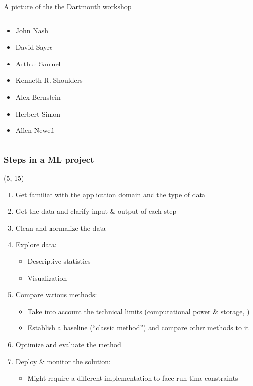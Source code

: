 \begin{frame}{A picture of the the Dartmouth workshop}
\begin{textblock}{95}
\begin{footnotesize}
\begin{columns}[T]
      \begin{column}{0.33\textwidth}
        \begin{itemize}
        \item John Nash
        \item David Sayre
        \item Arthur Samuel
        \item Kenneth R. Shoulders
        \item Alex Bernstein
        \item Herbert Simon
        \item Allen Newell
        \end{itemize}
      \end{column}
    \end{columns}
  \end{footnotesize}
\end{textblock}
\end{frame}


\begin{frame}
  \frametitle{Steps in a \ac{ML} project}

  \begin{textblock}{90}(5, 15)
    \begin{enumerate}
    \item Get familiar with the application domain and the type of data
    \item Get the data and clarify input \& output of each step
    \item Clean and normalize the data
    \item Explore data:
      \begin{itemize}
      \item Descriptive statistics
      \item Visualization
      \end{itemize}
    \item Compare various methods:
      \begin{itemize}
      \item Take into account the technical limits (computational power \&
        storage, \etc{})
      \item Establish a baseline (``classic method'') and compare other methods
        to it
      \end{itemize}
    \item Optimize and evaluate the method
    \item Deploy \& monitor the solution:
      \begin{itemize}
      \item Might require a different implementation to face run time constraints
      \end{itemize}
    \end{enumerate}
  \end{textblock}
\end{frame}
